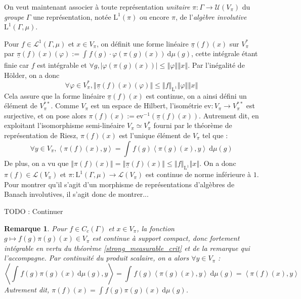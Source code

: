 \documentclass[a4paper,12pt]{article}
\newtheorem{remark}[theorem]{Remarque}
\newcommand{\ev}{\mathrm{ev}}
\newcommand{\norm}[1]{\left\Vert #1\right\Vert}
\newcommand{\abs}[1]{\left\vert#1\right\vert}
\newcommand{\ket}[1]{\left\langle #1 \right\rangle}
\newcommand{\integral}[4]{\int_{#1}^{#2} #3~\mathrm{d}#4}
\newcommand{\inv}{^{-1}}
\newcommand{\TODO}[1]{{\color{red}TODO :} #1}
\begin{document}
On veut maintenant associer à toute représentation \emph{unitaire} $\pi : \Gamma\to\mathcal{U}(V_\pi)$ du \emph{groupe} $\Gamma$ une
représentation, notée $\mathrm{L}^1(\pi)$ ou encore $\pi$, de l'\emph{algèbre involutive} $\mathrm{L}^1(\Gamma, \mu)$.

Pour $f\in\mathscr{L}^1(\Gamma, \mu)$ et $x\in V_\pi$, on définit une forme linéaire $\underline{\pi}(f)(x)$ sur $V_\pi^*$ par 
$\underline{\pi}(f)(x)(\varphi) := \integral{}{}{f(g)\cdot\varphi(\pi(g)(x))}{\mu(g)}$, cette intégrale étant finie car $f$ est
intégrable et $\forall g, \abs{\varphi(\pi(g)(x))}\le\norm{\varphi}\norm{x}$. Par l'inégalité de Hölder, on a donc 
\begin{equation*}
    \forall\varphi\in V_\pi^*, \norm{\underline{\pi}(f)(x)(\varphi)}\le\norm{f}_{\mathrm{L}^1}\norm{\varphi}\norm{x}
\end{equation*}
Cela assure que la forme linéaire $\underline{\pi}(f)(x)$ est continue, on a ainsi défini un élément de $V_\pi^{**}$. 
Comme $V_\pi$ est un espace de Hilbert, l'isométrie $\ev:V_\pi\to V_\pi^{**}$ est surjective, et on pose alors $\pi(f)(x) := \ev\inv(\underline{\pi}(f)(x))$. 
Autrement dit, en exploitant l'isomorphisme semi-linéaire $V_\pi\simeq V_\pi^*$ fourni par le théorème de représentation de Riesz, 
$\pi(f)(x)$ est l'unique élément de $V_\pi$ tel que :
\begin{equation*}
    \forall y\in V_\pi, \ket{\pi(f)(x), y} = \integral{}{}{f(g)\ket{\pi(g)(x), y}}{\mu(g)}
\end{equation*}
De plus, on a vu que $\norm{\pi(f)(x)} = \norm{\underline{\pi}(f)(x)} \le \norm{f}_{\mathrm{L}^1}\norm{x}$. 
On a donc $\pi(f)\in\mathcal{L}(V_\pi)$ et $\pi:\mathrm{L}^1(\Gamma, \mu)\to\mathcal{L}(V_\pi)$ est continue de norme inférieure à $1$.
Pour montrer qu'il s'agit d'un morphisme de représentations d'algèbres de Banach involutives, il s'agit donc de montrer...

\TODO{Continuer}

\begin{remark}\label{L1_repr_Cc}
    Pour $f\in C_c(\Gamma)$ et $x\in V_\pi$, la fonction $g\mapsto f(g)\pi(g)(x)\in V_\pi$ est continue à support compact,
    donc fortement intégrable en vertu du théorème \ref{strong_measurable_crit} et de la remarque qui l'accompagne. 
    Par continuité du produit scalaire, on a alors $\forall y\in V_\pi$ : 
    \begin{equation*}
        \ket{\integral{}{}{f(g)\pi(g)(x)}{\mu(g)}, y} = \integral{}{}{f(g)\ket{\pi(g)(x), y}}{\mu(g)} = \ket{\pi(f)(x), y}
    \end{equation*}
    Autrement dit, $\pi(f)(x) = \integral{}{}{f(g)\pi(g)(x)}{\mu(g)}$.
\end{remark}
\end{document}

